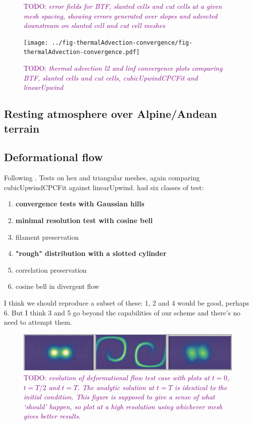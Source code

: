 \documentclass{article}
\newcommand{\TODO}[1]{\textcolor{purple}{TODO: \emph{#1}}}
\begin{document}
\begin{figure}
	\caption{\TODO{error fields for BTF, slanted cells and cut cells at a given mesh spacing, showing errors generated over slopes and advected downstream on slanted cell and cut cell meshes}}
\end{figure}

\begin{figure}
	\texttt{[image: ../fig-thermalAdvection-convergence/fig-thermalAdvection-convergence.pdf]}
	\caption{\TODO{thermal advection l2 and linf convergence plots comparing BTF, slanted cells and cut cells, cubicUpwindCPCFit and linearUpwind}}
\end{figure}

\subsection{Resting atmosphere over Alpine/Andean terrain}

\subsection{Deformational flow}
Following \citep{lauritzen2012}.  Tests on hex and triangular meshes, again comparing cubicUpwindCPCFit against linearUpwind.  \citet{lauritzen2012} had six classes of test:
\begin{enumerate}
	\item \textbf{convergence tests with Gaussian hills}
	\item \textbf{minimal resolution test with cosine bell}
	\item filament preservation
	\item \textbf{"rough" distribution with a slotted cylinder}
	\item correlation preservation
	\item cosine bell in divergent flow
\end{enumerate}
I think we should reproduce a subset of these: 1, 2 and 4 would be good, perhaps 6.  But I think 3 and 5 go beyond the capabilities of our scheme and there's no need to attempt them.

\begin{figure}
	\includegraphics[width=\textwidth]{hexCubUpEvolution.png}
	\caption{\TODO{evolution of deformational flow test case with plots at $t=0$, $t=T/2$ and $t=T$.  The analytic solution at $t=T$ is identical to the initial condition.  This figure is supposed to give a sense of what `should' happen, so plot at a high resolution using whichever mesh gives better results.}}
\end{figure}
\end{document}
